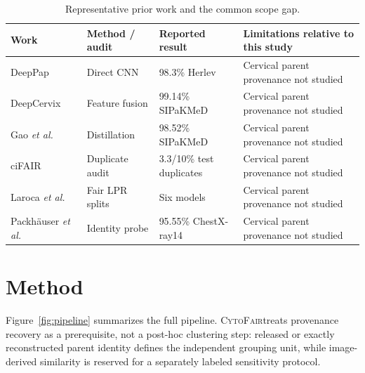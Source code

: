 \documentclass[conference]{IEEEtran}
\newcommand{\cytofair}{\textsc{CytoFair}}
\begin{document}
\begin{table}[t]
\caption{Representative prior work and the common scope gap.}
\label{tab:prior}
\centering
\scriptsize
\setlength{\tabcolsep}{8pt}
\begin{tabular}{llll}
\toprule
Work & Method / audit & Reported result & Limitations relative to this study \\
\midrule
DeepPap~\cite{zhang2017deeppap} & Direct CNN & 98.3\% Herlev & Cervical parent provenance not studied \\
DeepCervix~\cite{rahaman2021deepcervix} & Feature fusion & 99.14\% SIPaKMeD & Cervical parent provenance not studied \\
Gao \emph{et al.}~\cite{gao2022knowledge} & Distillation & 98.52\% SIPaKMeD & Cervical parent provenance not studied \\
ciFAIR~\cite{barz2020cifair} & Duplicate audit & 3.3/10\% test duplicates & Cervical parent provenance not studied \\
Laroca \emph{et al.}~\cite{laroca2023lpr} & Fair LPR splits & Six models & Cervical parent provenance not studied \\
Packh\"auser \emph{et al.}~\cite{packhauser2022reidentification} & Identity probe & 95.55\% ChestX-ray14 & Cervical parent provenance not studied \\
\bottomrule
\end{tabular}
\end{table}

\section{Method}
Figure~\ref{fig:pipeline} summarizes the full pipeline.
\cytofair treats provenance recovery as a prerequisite, not a post-hoc clustering step: released or exactly reconstructed parent identity defines the independent grouping unit, while image-derived similarity is reserved for a separately labeled sensitivity protocol.
\end{document}
